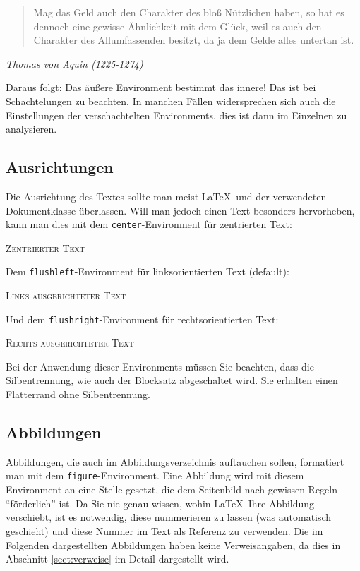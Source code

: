 \begin{quote}
Mag das Geld auch den Charakter des bloß Nützlichen haben, so 
hat es dennoch eine gewisse Ähnlichkeit mit dem Glück, weil es 
auch den Charakter des Allumfassenden besitzt, da ja dem Gelde 
alles untertan ist.
\end{quote}
\begin{flushright}
\textsl{Thomas von Aquin (1225-1274)}
\end{flushright}
Daraus folgt: Das äußere Environment bestimmt das innere! Das ist bei Schachtelungen zu beachten. In manchen Fällen widersprechen sich auch die Einstellungen der verschachtelten Environments, dies ist dann im Einzelnen zu analysieren.

\subsection{Ausrichtungen}\label{sect:ausrichtung}

Die Ausrichtung des Textes sollte man meist \LaTeX\ und der verwendeten Dokumentklasse überlassen. Will man jedoch einen Text besonders hervorheben, kann man dies mit dem \texttt{center}-Environment für zentrierten Text:
\begin{center}
\textsc{Zentrierter Text}
\end{center}

\noindent Dem \texttt{flushleft}-Environment für linksorientierten Text (default):

\begin{flushleft}
\textsc{Links ausgerichteter Text}
\end{flushleft}

\noindent Und dem \texttt{flushright}-Environment für rechtsorientierten Text:

\begin{flushright}
\textsc{Rechts ausgerichteter Text}
\end{flushright}

Bei der Anwendung dieser Environments müssen Sie beachten, dass die Silbentrennung, wie auch der Blocksatz abgeschaltet wird. Sie erhalten einen Flatterrand ohne Silbentrennung.

\subsection{Abbildungen}

Abbildungen, die auch im Abbildungsverzeichnis auftauchen sollen, formatiert man mit dem \texttt{figure}-Environment. Eine Abbildung wird mit diesem Environment an eine Stelle gesetzt, die dem Seitenbild nach gewissen Regeln "`förderlich"' ist. Da Sie nie genau wissen, wohin \LaTeX\ Ihre Abbildung verschiebt, ist es notwendig, diese nummerieren zu lassen (was automatisch geschieht) und diese Nummer im Text als Referenz zu verwenden. Die im Folgenden dargestellten Abbildungen haben keine Verweisangaben, da dies in Abschnitt \ref{sect:verweise} im Detail dargestellt wird. 

